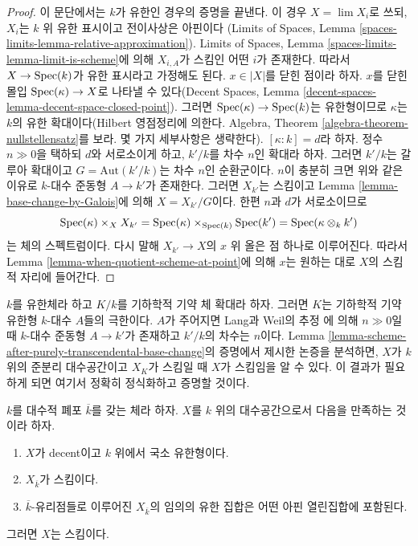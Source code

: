 \begin{proof}
\medskip\noindent
이 문단에서는 $k$가 유한인 경우의 증명을 끝낸다. 이 경우
$X = \lim X_i$로 쓰되, $X_i$는 $k$ 위 유한 표시이고 전이사상은 아핀이다
(Limits of Spaces, Lemma
\ref{spaces-limits-lemma-relative-approximation}). Limits of Spaces, Lemma
\ref{spaces-limits-lemma-limit-is-scheme}에 의해 $X_{i, A}$가 스킴인
어떤 $i$가 존재한다. 따라서 $X \to \mathop{\mathrm{Spec}}(k)$가 유한 표시라고
가정해도 된다. $x \in |X|$를 닫힌 점이라 하자. $x$를 닫힌 몰입
$\mathop{\mathrm{Spec}}(\kappa) \to X$로 나타낼 수 있다(Decent Spaces, Lemma
\ref{decent-spaces-lemma-decent-space-closed-point}). 그러면
$\mathop{\mathrm{Spec}}(\kappa) \to \mathop{\mathrm{Spec}}(k)$는 유한형이므로 $\kappa$는 $k$의 유한
확대이다(Hilbert 영점정리에 의한다. Algebra, Theorem
\ref{algebra-theorem-nullstellensatz}를 보라. 몇 가지 세부사항은
생략한다). $[\kappa : k] = d$라 하자. 정수 $n \gg 0$을 택하되
$d$와 서로소이게 하고, $k'/k$를 차수 $n$인 확대라 하자. 그러면
$k'/k$는 갈루아 확대이고 $G = \text{Aut}(k'/k)$는 차수 $n$인
순환군이다. $n$이 충분히 크면 위와 같은 이유로 $k$-대수 준동형
$A \to k'$가 존재한다.
그러면 $X_{k'}$는 스킴이고 Lemma
\ref{lemma-base-change-by-Galois}에 의해 $X = X_{k'}/G$이다. 한편 $n$과
$d$가 서로소이므로
$$
\mathop{\mathrm{Spec}}(\kappa) \times_{X} X_{k'} =
\mathop{\mathrm{Spec}}(\kappa) \times_{\mathop{\mathrm{Spec}}(k)} \mathop{\mathrm{Spec}}(k') =
\mathop{\mathrm{Spec}}(\kappa \otimes_k k')
$$
는 체의 스펙트럼이다. 다시 말해 $X_{k'} \to X$의 $x$ 위 올은
점 하나로 이루어진다. 따라서 Lemma
\ref{lemma-when-quotient-scheme-at-point}에 의해 $x$는 원하는 대로
$X$의 스킴적 자리에 들어간다.
\end{proof}

\begin{remark}
\label{remark-when-does-the-argument-work}
$k$를 유한체라 하고 $K/k$를 기하학적 기약 체 확대라 하자. 그러면
$K$는 기하학적 기약 유한형 $k$-대수 $A$들의 극한이다. $A$가 주어지면
Lang과 Weil의 추정 \cite{LW}에 의해 $n \gg 0$일 때 $k$-대수 준동형
$A \to k'$가 존재하고 $k'/k$의 차수는 $n$이다.
Lemma \ref{lemma-scheme-after-purely-transcendental-base-change}의 증명에서
제시한 논증을 분석하면, $X$가 $k$ 위의 준분리 대수공간이고 $X_K$가
스킴일 때 $X$가 스킴임을 알 수 있다. 이 결과가 필요하게 되면 여기서
정확히 정식화하고 증명할 것이다.
\end{remark}

\begin{lemma}
\label{lemma-scheme-over-algebraic-closure-enough-affines}
$k$를 대수적 폐포 $\overline{k}$를 갖는 체라 하자. $X$를 $k$ 위의
대수공간으로서 다음을 만족하는 것이라 하자.
\begin{enumerate}
\item $X$가 decent이고 $k$ 위에서 국소 유한형이다.
\item $X_{\overline{k}}$가 스킴이다.
\item $\overline{k}$-유리점들로 이루어진 $X_{\overline{k}}$의 임의의 유한 집합은
어떤 아핀 열린집합에 포함된다.
\end{enumerate}
그러면 $X$는 스킴이다.
\end{lemma}

